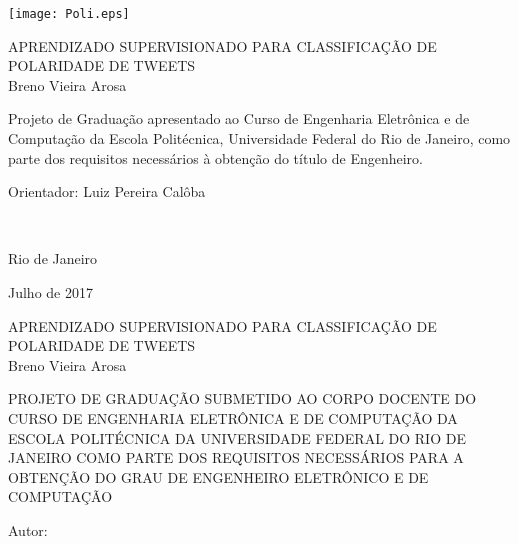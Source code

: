 \texttt{[image: Poli.eps]}

\begin{center}
\large{APRENDIZADO SUPERVISIONADO PARA CLASSIFICAÇÃO DE POLARIDADE DE TWEETS}\\
   \vspace{2cm}
\large{Breno Vieira Arosa}\\
\end{center}
   \vspace{3cm}
\hspace{7cm}
\hfill \parbox{8.0cm}{Projeto de Graduação apresentado ao Curso de Engenharia Eletrônica e de Computação da Escola Politécnica, Universidade Federal do Rio de Janeiro, como parte dos requisitos necessários à obtenção do título de Engenheiro.\\}
   \vspace{2cm}
\hfill \parbox{8.0cm}{Orientador: Luiz Pereira Calôba} \\
   \vspace{2cm}
\begin{center}
Rio de Janeiro

Julho de 2017
\end{center}




\pagebreak


\begin{center}
\large{APRENDIZADO SUPERVISIONADO PARA CLASSIFICAÇÃO DE POLARIDADE DE TWEETS}\\
   \vspace{1cm}
\large{Breno Vieira Arosa}\\
\end{center}
   \vspace{2cm}
PROJETO DE GRADUAÇÃO SUBMETIDO AO CORPO DOCENTE DO CURSO DE ENGENHARIA ELETRÔNICA E DE COMPUTAÇÃO DA ESCOLA POLITÉCNICA DA UNIVERSIDADE FEDERAL DO RIO DE JANEIRO COMO PARTE DOS REQUISITOS NECESSÁRIOS PARA A OBTENÇÃO DO GRAU DE ENGENHEIRO ELETRÔNICO E DE COMPUTAÇÃO

   \vspace{1cm}
Autor:
      \vspace{0.5cm}
      \begin{flushright}
         \parbox{10cm}{
            \hrulefill

            \vspace{-.375cm}

            \vspace{0.1cm}
         }
      \end{flushright}


